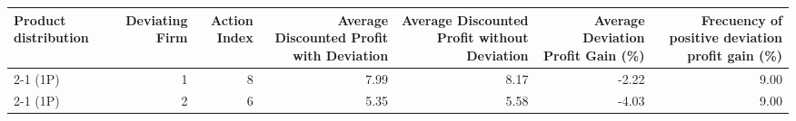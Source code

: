 \begin{tabular}{lrrrrrr}
\toprule
Product distribution & Deviating Firm & Action Index & Average Discounted Profit with Deviation & Average Discounted Profit without Deviation & Average Deviation Profit Gain (\%) & Frecuency of positive deviation profit gain (\%) \\
\midrule
2-1 (1P) & 1 & 8 & 7.99 & 8.17 & -2.22 & 9.00 \\
2-1 (1P) & 2 & 6 & 5.35 & 5.58 & -4.03 & 9.00 \\
\bottomrule
\end{tabular}
